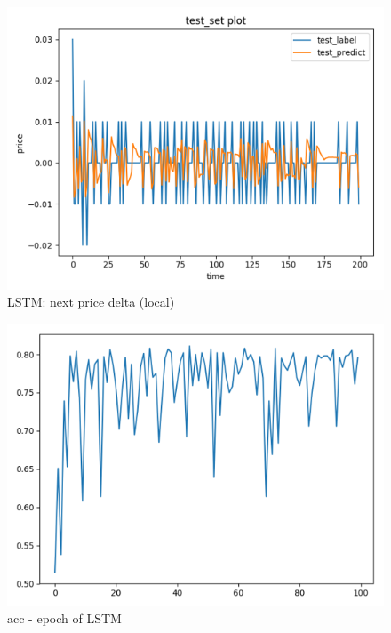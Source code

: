 \documentclass[10pt, conference, compsocconf]{IEEEtran}
\begin{document}
\begin{figure}[ht]
	\centering
	\includegraphics[scale=0.7]{lstm_next_price_delta_local.png}
	\caption{LSTM: next price delta (local)} \label{fig 6A}
\end{figure}

\begin{figure}[ht]
	\centering
	\includegraphics[scale=0.7]{lstm_iter_acc_mid.png}
	\caption{acc - epoch of LSTM} \label{fig 5B}
\end{figure}
\end{document}
